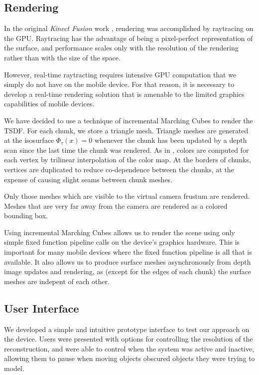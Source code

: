 \documentclass[conference,10pt]{IEEEtran}
\begin{document}
\subsection{Rendering}
In the original \textit{Kinect Fusion} work \cite{Newcombe}, rendering was
accomplished by raytracing on the GPU. Raytracing has the advantage of being a
pixel-perfect representation of the surface, and performance scales only with
the resolution of the rendering rather than with the size of the space. 

However, real-time raytracting requires intensive GPU computation that we simply
do not have on the mobile device. For that reason, it is necessary to develop a
real-time rendering solution that is amenable to the limited graphics
capabilities of mobile devices.

We have decided to use a technique of incremental Marching Cubes
\cite{Lorensen1987} to render the TSDF. For each chunk, we store a triangle
mesh. Triangle meshes are generated at the isosurface $\Phi_{\tau}(x) = 0$
whenever the chunk has been updated by a depth scan since the last time the
chunk was rendered. As in \cite{Bylow2013, Whelan2013},  colors are computed for
each vertex by trilinear interpolation of the color map. At the borders of chunks, vertices are
duplicated to reduce co-dependence between the chunks, at the expense of
causing slight seams between chunk meshes.

Only those meshes which are visible to the virtual camera frustum are rendered.
Meshes that are very far away from the camera are rendered as a colored bounding
box.

Using incremental Marching Cubes allows us to render the scene using only simple
fixed function pipeline calls on the device's graphics hardware. This is
important for many mobile devices where the fixed function pipeline is all that
is available. It also allows us to produce surface meshes asynchronously from
depth image updates and rendering, as (except for the edges of  each chunk) the
surface meshes are indepent of each other.

\subsection{User Interface}
We developed a simple and intuitive prototype interface to test our approach on
the device. Users were presented with options for controlling the resolution of
the reconstruction, and were able to control when the system was active and
inactive, allowing them to pause when moving objects obscured objects they were
trying to model.
\end{document}

